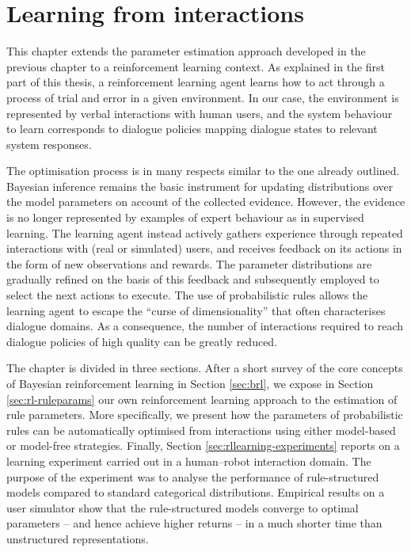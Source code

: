 \chapter{Learning from interactions}
\label{chap:rllearning}
This chapter extends the parameter estimation approach developed in the previous chapter to a reinforcement learning context.  As explained in the first part of this thesis, a reinforcement learning agent learns how to act through a process of trial and error in a given environment.  In our case, the environment is represented by verbal interactions with human users, and the system behaviour to learn corresponds to dialogue policies mapping dialogue states to relevant system responses. 

The optimisation process is in many respects similar to the one already outlined. Bayesian inference remains the basic instrument for updating distributions over the model parameters on account of the collected evidence.  However, the evidence is no longer represented by examples of expert behaviour as in supervised learning. The learning agent instead actively gathers experience through repeated interactions with (real or simulated) users, and receives feedback on its actions in the form of new observations and rewards. The parameter distributions are gradually refined on the basis of this feedback and subsequently employed to select the next actions to execute. The use of probabilistic rules allows the learning agent to  escape the ``curse of dimensionality'' that often characterises dialogue domains. As a consequence, the number of interactions required to reach dialogue policies of high quality can be greatly reduced. 

The chapter is divided in three sections.  After a short survey of the core concepts of Bayesian reinforcement learning in Section \ref{sec:brl}, we expose in Section \ref{sec:rl-ruleparams} our own reinforcement learning approach to the estimation of rule parameters.  More specifically, we present how the parameters of probabilistic rules can be automatically optimised from interactions using either model-based or model-free strategies. Finally, Section \ref{sec:rllearning-experiments} reports on a learning experiment carried out in a human--robot interaction domain. The purpose of the experiment was to analyse the performance of rule-structured models compared to standard categorical distributions. Empirical results on a user simulator show that the rule-structured models converge to optimal parameters -- and hence achieve higher returns -- in a much shorter time than unstructured representations. 

